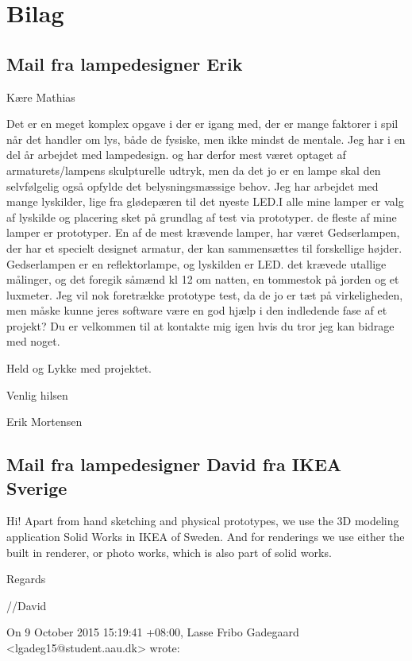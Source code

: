 \section*{Bilag}
\label{sec:bilag1}
\renewcommand{\thesubsection}{\Alph{subsection}}

\subsection{Mail fra lampedesigner Erik}
\label{sec:mailErik}
Kære Mathias

Det er en meget komplex opgave i der er igang med, der er mange faktorer i spil når det handler om lys, både de fysiske, men ikke mindst de mentale. Jeg har i en del år arbejdet med lampedesign. og har derfor mest været optaget af armaturets/lampens skulpturelle udtryk, men da det jo er en lampe skal den selvfølgelig  også opfylde det belysningsmæssige behov. Jeg har arbejdet med mange lyskilder, lige fra glødepæren til det nyeste LED.I alle mine lamper er valg af lyskilde og placering sket på grundlag af test via prototyper. de fleste af mine lamper er prototyper. En af de mest krævende lamper, har været Gedserlampen, der har et specielt designet armatur, der kan sammensættes til forskellige højder. Gedserlampen er en reflektorlampe, og lyskilden er LED. det krævede utallige målinger, og det foregik såmænd kl 12 om natten, en tommestok på jorden og et luxmeter. Jeg vil nok foretrække prototype test, da de jo er tæt på virkeligheden, men måske kunne jeres software være en god hjælp i den indledende fase af et projekt? Du er velkommen til at kontakte mig igen hvis du tror jeg kan bidrage med noget.

Held og Lykke med projektet.

Venlig hilsen

Erik Mortensen

\subsection{Mail fra lampedesigner David fra IKEA Sverige}
\label{sec:mailDavid}
Hi! Apart from hand sketching and physical prototypes, we use the 3D modeling application Solid Works in IKEA of Sweden. And for renderings we use either the built in renderer, or photo works, which is also part of solid works.

Regards 

//David 

  On 9 October 2015 15:19:41 +08:00, Lasse Fribo Gadegaard <lgadeg15@student.aau.dk> wrote:
   
